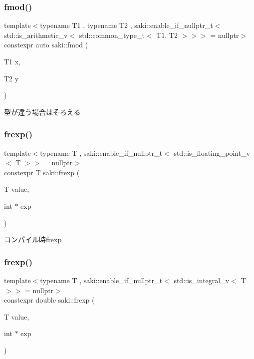 \subsubsection{\texorpdfstring{fmod()}{fmod()}\hspace{0.1cm}{\footnotesize\ttfamily [2/2]}}
{\footnotesize\ttfamily template$<$typename T1 , typename T2 , saki\+::enable\+\_\+if\+\_\+nullptr\+\_\+t$<$ std\+::is\+\_\+arithmetic\+\_\+v$<$ std\+::common\+\_\+type\+\_\+t$<$ T1, T2 $>$$>$$>$  = nullptr$>$ \\
constexpr auto saki\+::fmod (\begin{DoxyParamCaption}\item[{T1}]{x,  }\item[{T2}]{y }\end{DoxyParamCaption})}



型が違う場合はそろえる 

\mbox{\label{namespacesaki_a00438d1cd099cfd0e2938f9e3defd283}} 
\subsubsection{\texorpdfstring{frexp()}{frexp()}\hspace{0.1cm}{\footnotesize\ttfamily [1/2]}}
{\footnotesize\ttfamily template$<$typename T , saki\+::enable\+\_\+if\+\_\+nullptr\+\_\+t$<$ std\+::is\+\_\+floating\+\_\+point\+\_\+v$<$ T $>$$>$  = nullptr$>$ \\
constexpr T saki\+::frexp (\begin{DoxyParamCaption}\item[{T}]{value,  }\item[{int $\ast$}]{exp }\end{DoxyParamCaption})}



コンパイル時frexp 

\mbox{\label{namespacesaki_a915bdd850c89e1ed06c5087790109f11}} 
\subsubsection{\texorpdfstring{frexp()}{frexp()}\hspace{0.1cm}{\footnotesize\ttfamily [2/2]}}
{\footnotesize\ttfamily template$<$typename T , saki\+::enable\+\_\+if\+\_\+nullptr\+\_\+t$<$ std\+::is\+\_\+integral\+\_\+v$<$ T $>$$>$  = nullptr$>$ \\
constexpr double saki\+::frexp (\begin{DoxyParamCaption}\item[{T}]{value,  }\item[{int $\ast$}]{exp }\end{DoxyParamCaption})}



